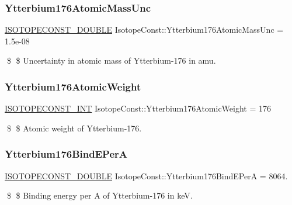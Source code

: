 \subsubsection{\texorpdfstring{Ytterbium176\+Atomic\+Mass\+Unc}{Ytterbium176AtomicMassUnc}}
{\footnotesize\ttfamily \mbox{\hyperlink{group___isotope_const-_macros_ga8f45a7272ce02c0b4c65c44636ed719a}{I\+S\+O\+T\+O\+P\+E\+C\+O\+N\+S\+T\+\_\+\+D\+O\+U\+B\+LE}} Isotope\+Const\+::\+Ytterbium176\+Atomic\+Mass\+Unc = 1.\+5e-\/08}

\$ \$ Uncertainty in atomic mass of Ytterbium-\/176 in amu. \mbox{\label{group___isotope_const-_ytterbium-_yb176_ga2fca4528608e6bfe6dff9cd4837281c8}} 
\subsubsection{\texorpdfstring{Ytterbium176\+Atomic\+Weight}{Ytterbium176AtomicWeight}}
{\footnotesize\ttfamily \mbox{\hyperlink{group___isotope_const-_macros_ga5f18360b3e99483a35c32d789e62621c}{I\+S\+O\+T\+O\+P\+E\+C\+O\+N\+S\+T\+\_\+\+I\+NT}} Isotope\+Const\+::\+Ytterbium176\+Atomic\+Weight = 176}

\$ \$ Atomic weight of Ytterbium-\/176. \mbox{\label{group___isotope_const-_ytterbium-_yb176_ga2bbba784b7ccefdbfbed975b8f5e3ff6}} 
\subsubsection{\texorpdfstring{Ytterbium176\+Bind\+E\+PerA}{Ytterbium176BindEPerA}}
{\footnotesize\ttfamily \mbox{\hyperlink{group___isotope_const-_macros_ga8f45a7272ce02c0b4c65c44636ed719a}{I\+S\+O\+T\+O\+P\+E\+C\+O\+N\+S\+T\+\_\+\+D\+O\+U\+B\+LE}} Isotope\+Const\+::\+Ytterbium176\+Bind\+E\+PerA = 8064.}

\$ \$ Binding energy per A of Ytterbium-\/176 in keV. \mbox{\label{group___isotope_const-_ytterbium-_yb176_ga7fe546cff9a67bd685c1ce18ed04d026}} 
